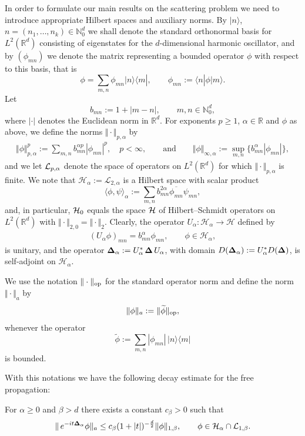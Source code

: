 

 In order to formulate our main results on the scattering problem we
need to introduce ap\-propriate Hilbert spaces and auxiliary norms.
By $\vert n\rangle$, $n=(n_1,\dots,n_k)\in\mathbb N_0^d$ we shall denote the
standard orthonormal basis for $L^2(\mathbb R^d)$ consisting of
eigenstates for the $d$-dimensional harmonic oscillator, and by
$(\phi_{mn})$ we denote the matrix representing a bounded operator
$\phi$ with respect to this basis, that is
\[
\phi = \sum_{m,n}\phi_{mn}\vert n\rangle\langle m|,\qquad \phi_{mn}:=\langle n|\phi|m\rangle .
\]
Let
\[
b_{mn} := 1+|m-n| ,\qquad m,n\in \mathbb N_0^d ,
\]
where $|\cdot|$ denotes the Euclidean norm in $\mathbb R^d$. For
exponents $p\geq 1$, $\alpha\in\mathbb R$ and $\phi$ as above, we def\/ine
the norms $\Vert\cdot \Vert_{p,\alpha}$  by
\begin{gather}
\label{alphanorms}
\Vert\phi\Vert_{p,\alpha}^p := \sum_{m,n}b_{mn}^{\alpha p}|\phi_{mn}|^p ,
\quad p<\infty, \qquad\mbox{and}\qquad
\Vert\phi\Vert_{\infty,\alpha}:=\sup_{m,n}\{b_{mn}^\alpha|\phi_{mn}|\} ,
\end{gather}
and we let ${\cal L}_{p,\alpha}$ denote the space of operators
on $L^2(\mathbb R^d)$ for which
$\Vert\cdot \Vert_{p,\alpha}$ is f\/inite. We note that
$\mathcal H_{\alpha}:=\mathcal L_{2,\alpha}$ is a  Hilbert space with
scalar product
\[
\langle\phi,\psi\rangle_\alpha:=\sum_{m,n}b_{mn}^{2\alpha} \overline{\phi_{mn}}
 \psi_{mn} ,
\]
and, in particular, ${\cal H}_{0}$ equals  the space $\cal H$ of
Hilbert--Schmidt operators on $L^2(\mathbb R^d)$ with $\Vert\cdot\Vert_{2,0} =
\Vert\cdot\Vert_2$.
Clearly, the operator $U_\alpha:\mathcal H_\alpha\to \mathcal H$ def\/ined by
\begin{gather}\label{Ualpha}
(U_\alpha\phi)_{mn}=
b^{\alpha}_{mn}\phi_{mn} ,\qquad \phi\in\mathcal H_\alpha ,
\end{gather}
is unitary, and the operator
${\bf\Delta}_\alpha := U_\alpha^*\, {\bf \Delta}\,U_\alpha$, with domain
$D({\bf\Delta}_\alpha):=U_\alpha^* D({\bf \Delta})$,
 is self-adjoint on $\mathcal H_\alpha$.

We use the notation $\Vert\cdot\Vert_{\rm op}$ for
the standard operator norm and def\/ine the norm $\Vert\cdot\Vert_a$ by
\[
\Vert\phi\Vert_a := \Vert\widetilde\phi\Vert_{\rm op} ,
\]
whenever the operator
\[
 \widetilde\phi := \sum_{m,n}|\phi_{mn}|\, |n\rangle\langle m|
\]
 is bounded.


With this notations we have the following decay estimate for the free
propagation:
\begin{theorem}\label{th2} For $\alpha\geq 0$ and  $\beta > d$ there exists a constant
$c_\beta>0$ such that
\begin{gather}\label{freedecay}
\Vert\, e^{-it{\bf\Delta}_\alpha}\phi \Vert_a  \leq  c_{\beta}(1+
|t|)^{-\frac{d}{2}} \Vert\phi\Vert_{1,\beta} ,
\qquad \phi\in {\cal H}_\alpha\cap {\cal L}_{1,\beta} .
\end{gather}
\end{theorem}

